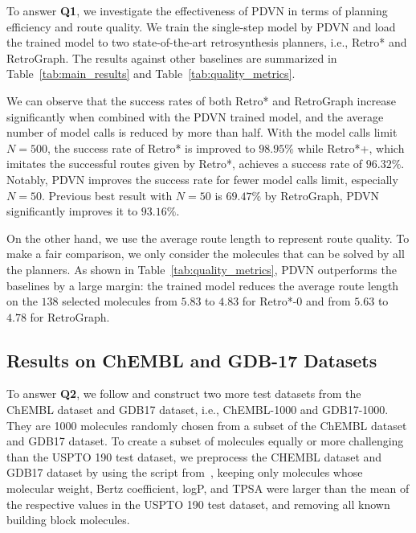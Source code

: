 \documentclass[nohyperref]{article}
\theoremstyle{plain}
\theoremstyle{definition}
\theoremstyle{remark}
\begin{document}
To answer \textbf{Q1}, we investigate the effectiveness of PDVN in terms of planning efficiency and route quality. We train the single-step model by PDVN and load the trained model to two state-of-the-art retrosynthesis planners, i.e., Retro* and RetroGraph. The results against other baselines are summarized in Table~\ref{tab:main_results} and Table~\ref{tab:quality_metrics}.

We can observe that the success rates of both Retro* and RetroGraph increase significantly when combined with the PDVN trained model, and the average number of model calls is reduced by more than half. With the model calls limit $N=500$, the success rate of Retro* is improved to $98.95\%$ while Retro*+, which imitates the successful routes given by Retro*, achieves a success rate of $96.32\%$. Notably, PDVN improves the success rate for fewer model calls limit, especially $N=50$. 
Previous best result with $N=50$ is $69.47\%$ by RetroGraph, PDVN significantly improves it to $93.16\%$.


On the other hand, we use the average route length to represent route quality.
To make a fair comparison, we only consider the molecules that can be solved by all the planners. As shown in  Table~\ref{tab:quality_metrics}, PDVN outperforms the baselines by a large margin: the trained model reduces the average route length on the $138$ selected molecules from $5.83$ to $4.83$ for Retro*-0 and from $5.63$ to $4.78$ for RetroGraph.



\subsection{Results on ChEMBL and GDB-17 Datasets}







To answer \textbf{Q2}, we follow \cite{tripp2022reevaluating} and construct two more test datasets from the ChEMBL dataset and GDB17 dataset, i.e., ChEMBL-1000 and GDB17-1000. 
They are 1000 molecules randomly chosen from a subset of the ChEMBL dataset and GDB17 dataset.
To create a subset of molecules equally or more challenging than the USPTO 190 test dataset, 
we preprocess the CHEMBL dataset and GDB17 dataset by using the script from~\cite{brown2019guacamol}, 
keeping only molecules whose 
molecular weight, Bertz coefficient, logP, and TPSA were larger than the mean of the respective values in the USPTO 190 test dataset, and removing all known building block molecules.
\end{document}
